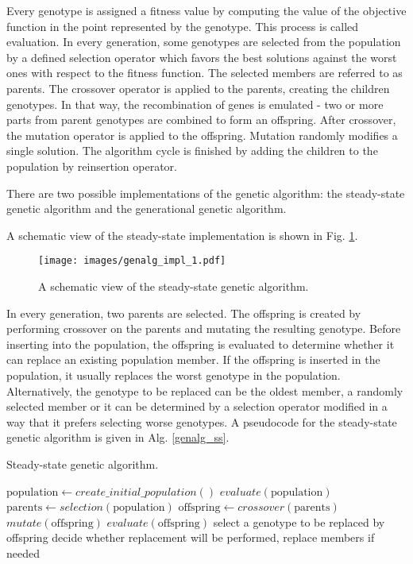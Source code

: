 Every genotype is assigned a fitness value by computing the value of the objective function in the point represented by the genotype.
This process is called evaluation.
In every generation, some genotypes are selected from the population by a defined selection operator which favors the best solutions against the worst ones with respect to the fitness function.
The selected members are referred to as parents.
The crossover operator is applied to the parents, creating the children genotypes.
In that way, the recombination of genes is emulated - two or more parts from parent genotypes are combined to form an offspring.
After crossover, the mutation operator is applied to the offspring.
Mutation randomly modifies a single solution.
The algorithm cycle is finished by adding the children to the population by reinsertion operator.

There are two possible implementations of the genetic algorithm: the steady-state genetic algorithm and the generational genetic algorithm.

A schematic view of the steady-state implementation is shown in Fig. \ref{genalg:impl_1}.
\begin{figure}[ht]
    \centering
    \texttt{[image: images/genalg\_impl\_1.pdf]}
    \caption{A schematic view of the steady-state genetic algorithm.}
    \label{genalg:impl_1}
\end{figure}
In every generation, two parents are selected.
The offspring is created by performing crossover on the parents and mutating the resulting genotype.
Before inserting into the population, the offspring is evaluated to determine whether it can replace an existing population member.
If the offspring is inserted in the population, it usually replaces the worst genotype in the population.
Alternatively, the genotype to be replaced can be the oldest member, a randomly selected member or it can be determined by a selection operator modified in a way that it prefers selecting worse genotypes.
A pseudocode for the steady-state genetic algorithm is given in Alg. \ref{genalg_ss}.
\begin{algorithm}
\caption{Steady-state genetic algorithm.\label{genalg_ss}}
\begin{algorithmic}[1]
\State $\text{population} \gets create\_initial\_population()$
\State $evaluate(\text{population})$
\State $\text{parents} \leftarrow selection(\text{population})$
\State $\text{offspring} \leftarrow crossover(\text{parents})$
\State $mutate(\text{offspring})$
\State $evaluate(\text{offspring})$
\State select a genotype to be replaced by offspring
\State decide whether replacement will be performed, replace members if needed
\EndWhile
\end{algorithmic}
\end{algorithm}

